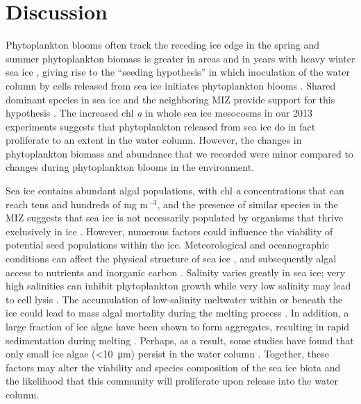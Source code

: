 \section{Discussion}

Phytoplankton blooms often track the receding ice edge in the spring \citep{Smith1985-lx,Smith1986-en} and summer phytoplankton biomass is greater in areas and in years with heavy winter sea ice \citep{Nicol2000-gd,saba2014winter}, giving rise to the ``seeding hypothesis'' in which inoculation of the water column by cells released from sea ice initiates phytoplankton blooms \citep{Garrison1989-sn,Garrison2007-ea}. Shared dominant species in sea ice and the neighboring MIZ provide support for this hypothesis \citep{Garrison1989-sn,Garrison1985-yg,Lannuzel2013-gk,Smith1986-en}. The increased chl \emph{a} in whole sea ice mesocosms in our 2013 experiments suggests that phytoplankton released from sea ice do in fact proliferate to an extent in the water column. However, the changes in phytoplankton biomass and abundance that we recorded were minor compared to changes during phytoplankton blooms in the environment. 

Sea ice contains abundant algal populations, with chl \emph{a} concentrations that can reach tens and hundreds of mg m$^{-3}$, and the presence of similar species in the MIZ suggests that sea ice is not necessarily populated by organisms that thrive exclusively in ice \citep{Garrison2007-ea}. However, numerous factors could influence the viability of potential seed populations within the ice. Meteorological and oceanographic conditions can affect the physical structure of sea ice \citep{Ackley1994-ld}, and subsequently algal access to nutrients and inorganic carbon \citep{Fritsen1994-zw,Gleitz1995-un}. Salinity varies greatly in sea ice; very high salinities can inhibit phytoplankton growth while very low salinity may lead to cell lysis \citep{Etheridge2005-vg,Garrison1985-yg}. The accumulation of low-salinity meltwater within or beneath the ice could lead to mass algal mortality during the melting process \citep{Lizotte2008-un}. In addition, a large fraction of ice algae have been shown to form aggregates, resulting in rapid sedimentation during melting \citep{Giesenhagen1999-kq,Riebesell1991-xy}. Perhaps, as a result, some studies have found that only small ice algae (<\SI{10}{\micro\meter}) persist in the water column \citep{Mathot1991-nv}. Together, these factors may alter the viability and species composition of the sea ice biota and the likelihood that this community will proliferate upon release into the water column. 

